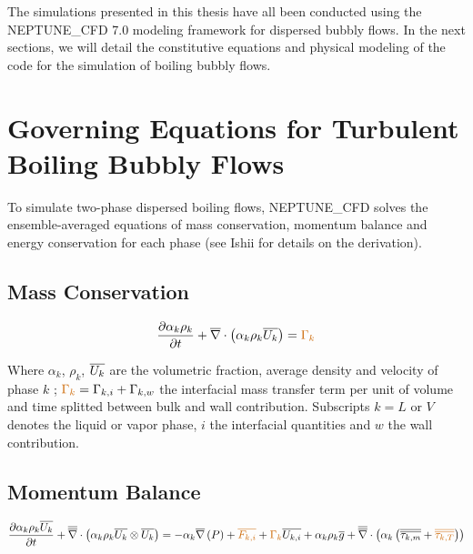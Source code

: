 \npar

The simulations presented in this thesis have all been conducted using the NEPTUNE\_CFD 7.0 modeling framework for dispersed bubbly flows. In the next sections, we will detail the constitutive equations and physical modeling of the code for the simulation of boiling bubbly flows.


\section{Governing Equations for Turbulent Boiling Bubbly Flows}

To simulate two-phase dispersed boiling flows, NEPTUNE\_CFD solves the ensemble-averaged equations of mass conservation, momentum balance and energy conservation for each phase (see Ishii \cite{ishii_thermo-fluid_2011} for details on the derivation).



\subsection{Mass Conservation}
\begin{equation}
	\dtime{\alpha_{k}\rho_{k}} + \divg{\alpha_{k}\rho_{k} \vect{U_{k}}} = \orangemath{\Gamma_{k}}
	\label{eq:mass}
\end{equation}

Where $\alpha_{k}$, $\rho_{k}$, $\overline{U_{k}}$ are the volumetric fraction, average density and velocity of phase $k$ ; $\orangemath{\Gamma_{k}}=\Gamma_{k,i}+\Gamma_{k,w}$ the interfacial mass transfer term per unit of volume and time splitted between bulk and wall contribution.
Subscripts $k= L$ or $V$ denotes the liquid or vapor phase, $i$ the interfacial quantities and $w$ the wall contribution.

\subsection{Momentum Balance}

\begin{equation}
	\dtime{\alpha_{k}\rho_{k}\vect{U_{k}}} + \vecdivg{\alpha_{k}\rho_{k} \vect{U_{k}}\otimes \vect{U_{k}}} = -\alpha_{k}\grad{P} + \orangemath{\vect{F_{k,i}}} + \orangemath{\Gamma_{k}}\vect{U_{k,i}} + \alpha_{k}\rho_{k}\vect{g} + \vecdivg{\alpha_{k} \parth{ \tens{\tau_{k,m}} + \orangemath{\tens{\tau_{k,T}}} }}
\label{eq:momentum}
\end{equation}

